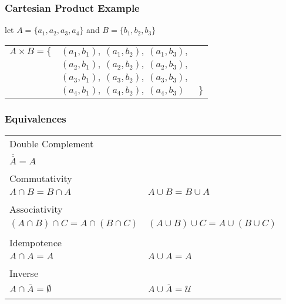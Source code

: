 \documentclass[dvipsnames]{beamer}
\begin{document}
\begin{frame}
  \frametitle{Cartesian Product Example}

  \begin{example}
    let $A = \{a_1, a_2, a_3, a_4\}$ and $B = \{b_1, b_2, b_3\}$

    \medskip
    \begin{tabular}{rll}
      $A \times B = \{$ & $(a_1, b_1),~(a_1, b_2),~(a_1, b_3),$ &\\
                        & $(a_2, b_1),~(a_2, b_2),~(a_2, b_3),$ &\\
                        & $(a_3, b_1),~(a_3, b_2),~(a_3, b_3),$ &\\
                        & $(a_4, b_1),~(a_4, b_2),~(a_4, b_3)$  & $\}$
    \end{tabular}
  \end{example}
\end{frame}

\begin{frame}
  \frametitle{Equivalences}

  \begin{tabular}{ll}
    \alert{Double Complement} &\\
      $\overline{\overline{A}} = A$\\\\
    \pause
    \alert{Commutativity} &\\
      $A \cap B = B \cap A$ &
      $A \cup B = B \cup A$\\\\
    \pause
    \alert{Associativity} &\\
      $(A \cap B) \cap C = A \cap (B \cap C)$ &
      $(A \cup B) \cup C = A \cup (B \cup C)$\\\\
    \pause
    \alert{Idempotence} &\\
      $A \cap A = A$ &
      $A \cup A = A$\\\\
    \pause
    \alert{Inverse} &\\
      $A \cap \overline{A} = \emptyset$ &
      $A \cup \overline{A} = \mathcal{U}$\\\\
  \end{tabular}
\end{frame}
\end{document}
